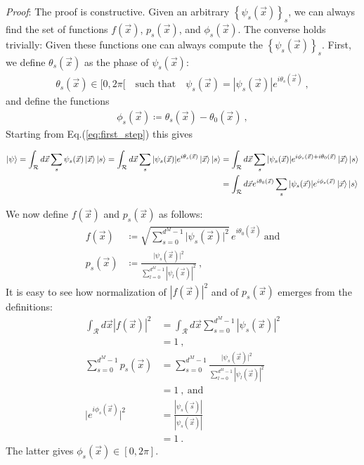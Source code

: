 \documentclass[draft,nofootinbib,pre,twocolumn,showpacs,showkeys,preprintnumbers,floatfix]{revtex4-1}
\newcommand{\1}{\mathbbm{1}}
\begin{document}
\emph{Proof}: The proof is constructive. Given an arbitrary
$\left\{ \psi_s(\vec{x}) \right\}_s$, we can always find the set of functions
$f(\vec{x})$, $p_s(\vec{x})$, and $\phi_s(\vec{x})$. The converse holds
trivially: Given these functions one can always compute the $\left\{
\psi_s(\vec{x}) \right\}_s$. First, we define $\theta_s(\vec{x})$ as
the phase of $\psi_s(\vec{x})$:
\begin{align*}
\theta_s(\vec{x}) \in [0,2\pi[ \quad \mathrm{such \,\, that} \quad \psi_s(\vec{x}) = |\psi_s(\vec{x})| e^{i\theta_s(\vec{x})} 
  ~,
\end{align*}
and define the functions
\begin{align*}
\phi_s(\vec{x}) \coloneqq \theta_s(\vec{x}) - \theta_0(\vec{x})
  ~,
\end{align*}
Starting from Eq.(\ref{eq:first_step}) this gives

\begin{align*}
\ket{\psi} = \int_{\mathcal{R}} d\vec{x} \sum_{s} \psi_s(\vec{x})\ket{\vec{x}} \ket{s} = \int_{\mathcal{R}} d\vec{x} \sum_{s} \vert \psi_s(\vec{x}) \vert e^{i\theta_s(\vec{x})}\ket{\vec{x}} \ket{s} & =  \int_{\mathcal{R}} d\vec{x} \sum_{s} \vert \psi_s(\vec{x}) \vert e^{i\phi_s(\vec{x})+i\theta_0(\vec{x})}\ket{\vec{x}} \ket{s} \\ & = \int_{\mathcal{R}} d\vec{x} e^{i\theta_0(\vec{x})}\sum_{s} \vert \psi_s(\vec{x}) \vert e^{i\phi_s(\vec{x})}\ket{\vec{x}} \ket{s}
\end{align*}



We now define $f(\vec{x})$ and $p_s(\vec{x})$ as follows:
\begin{align*}
f(\vec{x}) & \coloneqq \sqrt{\sum_{s=0}^{d^M-1} \vert \psi_s(\vec{x}) \vert^2}
  \, e^{i \theta_0(\vec{x})} ~\text{and} \\
p_s(\vec{x}) & \coloneqq
  \frac{\vert \psi_s(\vec{x})\vert^2}{\sum_{l=0}^{d^M-1}\left\vert \psi_l(\vec{x})\right\vert^2}
  ~,
\end{align*}
It is easy to see how normalization of $|f(\vec{x})|^2$ and of $p_s(\vec{x})$ emerges from the definitions:
\begin{align*}
\int_{\mathcal{R}} d\vec{x} \left\vert f(\vec{x})\right\vert^2
  & = \int_{\mathcal{R}} d\vec{x}
  \sum_{s=0}^{d^M-1} \left\vert \psi_s(\vec{x}) \right\vert^2 \\
  & = 1 ~,\\
\sum_{s=0}^{d^M-1} p_s(\vec{x})
  & = \sum_{s=0}^{d^M-1}
  \frac{\vert \psi_s(\vec{x})\vert^2}{\sum_{l=0}^{d^M-1}\left\vert
  \psi_l(\vec{x})\right\vert^2} \\
  & = 1 ~,~\text{and} \\
\vert e^{i\phi_s(\vec{x})}\vert^2
  & = \frac{|\psi_s(\vec{s})|}{|\psi_s(\vec{x})|} \\
  & = 1
  ~.
\end{align*}
The latter gives $\phi_s(\vec{x}) \in [0,2\pi]$.
\end{document}
